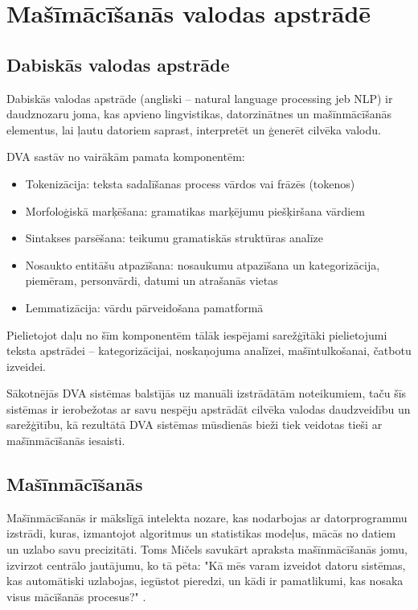 \chapter{Mašīmācīšanās valodas apstrādē}
\section{Dabiskās valodas apstrāde}
Dabiskās valodas apstrāde (angliski – natural language processing jeb NLP) ir daudznozaru joma, kas apvieno lingvistikas, datorzinātnes un mašīnmācīšanās elementus, lai ļautu datoriem saprast, interpretēt un ģenerēt cilvēka valodu. 

DVA sastāv no vairākām pamata komponentēm:
\begin{itemize}
\item Tokenizācija: teksta sadalīšanas process vārdos vai frāzēs (tokenos)
\item Morfoloģiskā marķēšana: gramatikas marķējumu piešķiršana vārdiem
\item Sintakses parsēšana: teikumu gramatiskās struktūras analīze
\item Nosaukto entitāšu atpazīšana: nosaukumu atpazīšana un kategorizācija, piemēram, personvārdi, datumi un atrašanās vietas
\item Lemmatizācija: vārdu pārveidošana pamatformā
\end{itemize}

Pielietojot daļu no šīm komponentēm tālāk iespējami sarežģītāki pielietojumi teksta apstrādei – kategorizācijai, noskaņojuma analīzei, mašīntulkošanai, čatbotu izveidei. 

Sākotnējās DVA sistēmas balstījās uz manuāli izstrādātām noteikumiem, taču šīs sistēmas ir ierobežotas ar savu nespēju apstrādāt cilvēka valodas daudzveidību un sarežģītību, kā rezultātā DVA sistēmas mūsdienās bieži tiek veidotas tieši ar mašīnmācīšanās iesaisti.

\section{Mašīnmācīšanās}
Mašīnmācīšanās ir mākslīgā intelekta nozare, kas nodarbojas ar datorprogrammu izstrādi, kuras, izmantojot algoritmus un statistikas modeļus, mācās no datiem un uzlabo savu precizitāti. Toms Mičels savukārt apraksta mašīnmācīšanās jomu, izvirzot centrālo jautājumu, ko tā pēta: "Kā mēs varam izveidot datoru sistēmas, kas automātiski uzlabojas, iegūstot pieredzi, un kādi ir pamatlikumi, kas nosaka visus mācīšanās procesus?" \cite{definitionML}.

